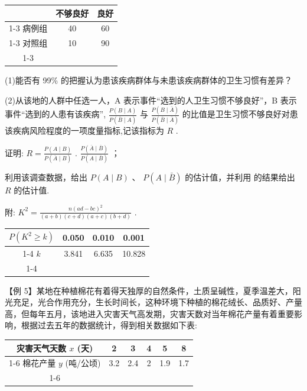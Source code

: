 \begin{center}
\begin{tabular}{|c|c|c|}
\hline
\phantom{X} & 不够良好 & 良好 \\
\cline{1-3}
病例组 & 40 & 60 \\
\cline{1-3}
对照组 & 10 & 90 \\
\cline{1-3}
\hline
\end{tabular}
\end{center}

(1)能否有 99\% 的把握认为患该疾病群体与未患该疾病群体的卫生习惯有差异？

(2)从该地的人群中任选一人，A 表示事件“选到的人卫生习惯不够良好”，B 表示事件“选到的人患有该疾病”, $\frac{P\left( {B \mid  A}\right) }{P\left( {\bar{B} \mid  A}\right) }$ 与 $\frac{P\left( {B \mid  \bar{A}}\right) }{P\left( {\bar{B} \mid  \bar{A}}\right) }$ 的比值是卫生习惯不够良好对患该疾病风险程度的一项度量指标,记该指标为 $R$ .

   证明: $R = \frac{P\left( {A \mid  B}\right) }{P\left( {\overline{A} \mid  B}\right) }$ . $\frac{P\left( {\overline{A} \mid  \overline{B}}\right) }{P\left( {A \mid  \overline{B}}\right) }$ ；

   利用该调查数据，给出 $P\left( {A \mid  B}\right)$ 、 $P\left( {A \mid  \bar{B}}\right)$ 的估计值，并利用  的结果给出 $R$ 的估计值.

附: ${K}^{2} = \frac{n{\left( ad - bc\right) }^{2}}{\left( {a + b}\right) \left( {c + d}\right) \left( {a + c}\right) \left( {b + d}\right) }$ .

\begin{center}
\begin{tabular}{|c|c|c|c|}
\hline
$P\left( {{K}^{2} \geq  k}\right)$ & 0.050 & 0.010 & 0.001 \\
\cline{1-4}
$k$ & 3.841 & 6.635 & 10.828 \\
\cline{1-4}
\hline
\end{tabular}
\end{center}

【例 5】某地在种植棉花有着得天独厚的自然条件，土质呈碱性，夏季温差大，阳光充足，光合作用充分，生长时间长，这种环境下种植的棉花绒长、品质好、产量高，但每年五月，该地进入灾害天气高发期，灾害天数对当年棉花产量有着重要影响，根据过去五年的数据统计，得到相关数据如下表:

\begin{center}
\begin{tabular}{|c|c|c|c|c|c|}
\hline
灾害天气天数 $x$ (天) & 2 & 3 & 4 & 5 & 8 \\
\cline{1-6}
棉花产量 $y$ (吨/公顷) & 3.2 & 2.4 & 2 & 1.9 & 1.7 \\
\cline{1-6}
\hline
\end{tabular}
\end{center}


